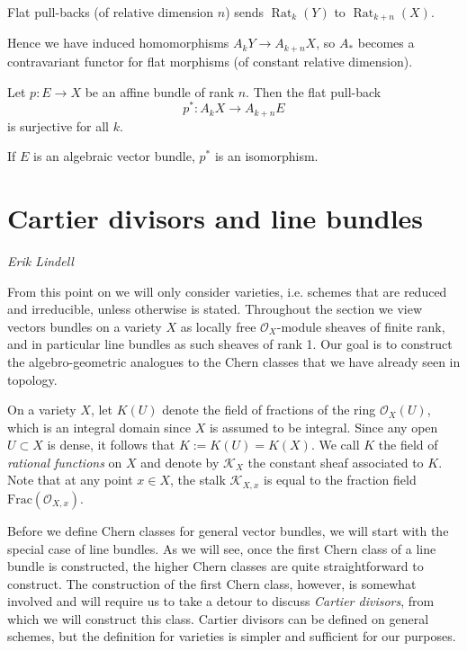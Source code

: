 \documentclass[a4paper,openany]{scrbook}
\DeclareMathOperator{\Rat}{Rat}
\newcommand{\chapterauthor}[1]{\hfill\emph{#1}\par\noindent}
\begin{document}
\begin{thm} 
Flat pull-backs (of relative dimension $n$) sends $\Rat_k(Y)$ to $\Rat_{k+n}(X)$.
\end{thm}

Hence we have induced homomorphisms $A_kY\to A_{k+n}X$, so $A_*$ becomes a contravariant functor for flat morphisms (of constant relative dimension).

\begin{thm} 
 Let $p\colon E\to X$ be an affine bundle of rank $n$. Then the flat pull-back
 \[
 p^*:A_kX\to A_{k+n}E
 \]
 is surjective for all $k$.

 If $E$ is an algebraic vector bundle, $p^*$ is an isomorphism.
\end{thm}


\section{Cartier divisors and line bundles}
\chapterauthor{Erik Lindell}

From this point on we will only consider varieties, i.e. schemes that are reduced and irreducible, unless otherwise is stated. Throughout the section we view vectors bundles on a variety $X$ as locally free $\mathscr{O}_X$-module sheaves of finite rank, and in particular line bundles as such sheaves of rank 1. Our goal is to construct the algebro-geometric analogues to the Chern classes that we have already seen in topology.

On a variety $X$, let $K(U)$ denote the field of fractions of the ring $\mathscr{O}_X(U)$, which is an integral domain since $X$ is assumed to be integral. Since any open $U\subset X $ is dense, it follows that $K:=K(U)=K(X)$. We call $K$ the field of \textit{rational functions} on $X$ and denote by $\mathscr{K}_X$ the constant sheaf associated to $K$. Note that at any point $x\in X$, the stalk $\mathscr{K}_{X,x}$ is equal to the fraction field $\mathrm{Frac}(\mathscr{O}_{X,x})$.

Before we define Chern classes for general vector bundles, we will start with the special case of line bundles. As we will see, once the first Chern class of a line bundle is constructed, the higher Chern classes are quite straightforward to construct. The construction of the first Chern class, however, is somewhat involved and will require us to take a detour to discuss \textit{Cartier divisors}, from which we will construct this class. Cartier divisors can be defined on general schemes, but the definition for varieties is simpler and sufficient for our purposes. 
\end{document}
